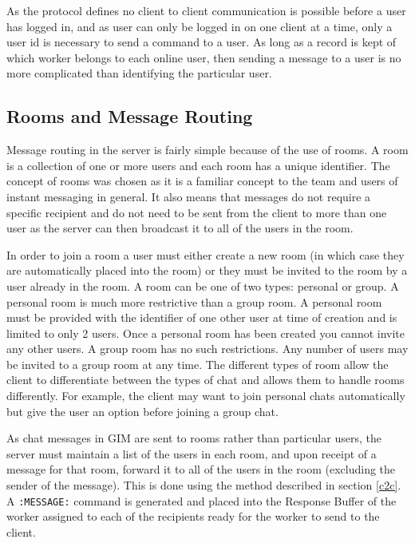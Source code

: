 As the protocol defines no client to client communication is possible before a user has logged in, and as user can only be logged in on one client at a time, only a user id is necessary to send a command to a user. As long as a record is kept of which worker belongs to each online user, then sending a message to a user is no more complicated than identifying the particular user.

\subsection{Rooms and Message Routing}
\label{message_routing}

Message routing in the server is fairly simple because of the use of rooms. A room is a collection of one or more users and each room has a unique identifier. The concept of rooms was chosen as it is a familiar concept to the team and users of instant messaging in general. It also means that messages do not require a specific recipient and do not need to be sent from the client to more than one user as the server can then broadcast it to all of the users in the room. 

In order to join a room a user must either create a new room (in which case they are automatically placed into the room) or they must be invited to the room by a user already in the room. A room can be one of two types: personal or group. A personal room is much more restrictive than a group room. A personal room must be provided with the identifier of one other user at time of creation and is limited to only 2 users. Once a personal room has been created you cannot invite any other users. A group room has no such restrictions. Any number of users may be invited to a group room at any time. The different types of room allow the client to differentiate between the types of chat and allows them to handle rooms differently. For example, the client may want to join personal chats automatically but give the user an option before joining a group chat.

As chat messages in GIM are sent to rooms rather than particular users, the server must maintain a list of the users in each room, and upon receipt of a message for that room, forward it to all of the users in the room (excluding the sender of the message). This is done using the method described in section \ref{c2c}. A \texttt{:MESSAGE:} command is generated and placed into the Response Buffer of the worker assigned to each of the recipients ready for the worker to send to the client.

